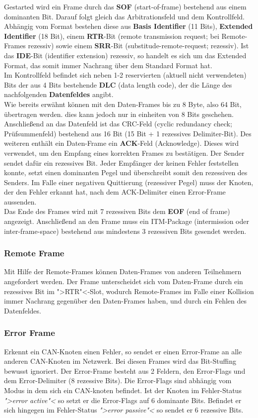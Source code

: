	Gestarted wird ein Frame durch das \textbf{SOF} (start-of-frame) bestehend aus einem dominanten Bit. Darauf folgt gleich das Arbitrationsfeld und dem Kontrollfeld. Abhängig vom Format bestehen diese aus \textbf{Basis Identifier} (11 Bits), \textbf{Extended Identifier} (18 Bit), einem \textbf{RTR}-Bit (remote transmission request; bei Remote-Frames rezessiv) sowie einem \textbf{SRR}-Bit (substitude-remote-request; rezessiv). Ist das \textbf{IDE}-Bit (identifier extension) rezessiv, so handelt es sich um das Extended Format, das somit immer Nachrang über dem Standard Format hat.\\ Im Kontrollfeld befindet sich neben 1-2 reservierten (aktuell nicht verwendeten) Bits der aus 4 Bits bestehende \textbf{DLC} (data length code), der die Länge des nachfolgenden \textbf{Datenfeldes} angibt.\\
	Wie bereits erwähnt können mit den Daten-Frames bis zu 8 Byte, also 64 Bit, übertragen werden. dies kann jedoch nur in einheiten von 8 Bits geschehen. Anschließend an das Datenfeld ist das CRC-Feld (cyclic redundancy check; Prüfsummenfeld) bestehend aus 16 Bit (15 Bit + 1 rezessives Delimiter-Bit).
	Des weiteren enthält ein Daten-Frame ein \textbf{ACK}-Feld (Acknowledge). Dieses wird verwendet, um den Empfang eines korrekten Frames zu bestätigen. Der Sender sendet dafür ein rezessives Bit. Jeder Empfänger der keinen Fehler feststellen konnte, setzt einen dominanten Pegel und überschreibt somit den rezessiven des Senders. Im Falle einer negativen Quittierung (rezessiver Pegel) muss der Knoten, der den Fehler erkannt hat, nach dem ACK-Delimiter einen Error-Frame aussenden.\\Das Ende des Frames wird mit 7 rezessiven Bits dem \textbf{EOF} (end of frame) angezeigt. Anschließend an den Frame muss ein ITM-Package (intermission oder inter-frame-space) bestehend aus mindestens 3 rezessiven Bits gesendet werden.
	
	\subsubsection{Remote Frame}
	Mit Hilfe der Remote-Frames können Daten-Frames von anderen Teilnehmern angefordert werden. Der Frame unterscheidet sich vom Daten-Frame durch ein rezessives Bit im ">RTR"<-Slot, wodurch Remote-Frames im Falle einer Kollision immer Nachrang gegenüber den Daten-Frames haben, und durch ein Fehlen des Datenfeldes.
	
	\subsubsection{Error Frame}
	Erkennt ein CAN-Knoten einen Fehler, so sendet er einen Error-Frame an alle anderen CAN-Knoten im Netzwerk. Bei diesen Frames wird das Bit-Stuffing bewusst ignoriert. Der Error-Frame besteht aus 2 Feldern, den Error-Flags und dem Error-Delimiter (8 rezessive Bits).
	Die Error-Flags sind abhängig vom Modus in dem sich ein CAN-knoten befindet. Ist der Knoten im Fehler-Status \textit{">error active"<} so setzt er die Error-Flags auf 6 dominante Bits. Befindet er sich hingegen im Fehler-Status \textit{">error passive"<} so sendet er 6 rezessive Bits.
	
